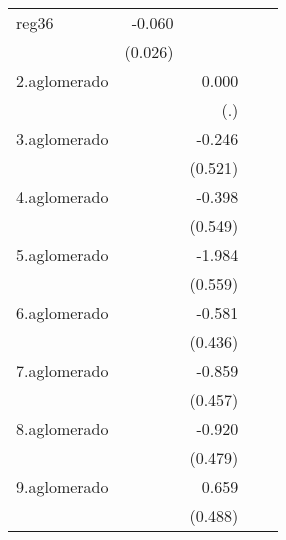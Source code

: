 {\begin{longtable}{l*{4}{D{.}{.}{-1}}}
\addlinespace
reg36       &      -0.060\sym{*}  &                     &                     &                     \\
            &     (0.026)         &                     &                     &                     \\
\addlinespace
2.aglomerado&                     &       0.000         &                     &                     \\
            &                     &         (.)         &                     &                     \\
\addlinespace
3.aglomerado&                     &      -0.246         &                     &                     \\
            &                     &     (0.521)         &                     &                     \\
\addlinespace
4.aglomerado&                     &      -0.398         &                     &                     \\
            &                     &     (0.549)         &                     &                     \\
\addlinespace
5.aglomerado&                     &      -1.984\sym{***}&                     &                     \\
            &                     &     (0.559)         &                     &                     \\
\addlinespace
6.aglomerado&                     &      -0.581         &                     &                     \\
            &                     &     (0.436)         &                     &                     \\
\addlinespace
7.aglomerado&                     &      -0.859         &                     &                     \\
            &                     &     (0.457)         &                     &                     \\
\addlinespace
8.aglomerado&                     &      -0.920         &                     &                     \\
            &                     &     (0.479)         &                     &                     \\
\addlinespace
9.aglomerado&                     &       0.659         &                     &                     \\
            &                     &     (0.488)         &                     &                     \\

\end{longtable}}
